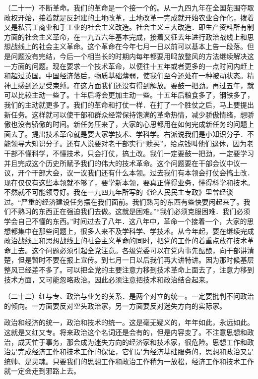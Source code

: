 （二十一）不断革命。我们的革命是一个接一个的。从一九四九年在全国范围夺取政权开始，接着就是反封建的土地改革，土地改革一完成就开始农业合作化，拨着又是私营工商业和手工业的社会主义改造。社会主义三大改造．即生产资料所有制方面的社会主义革命，在一九五六年基本完成，接着又征去年进行政治战线上和思想战线上的社会主义革命。这个革命在今年七月一日以前可以基本上告一段落。但是问题没有完结，今后一个相当长的时期内每年都要用鸣放整风的方法继续解决这一方面的问题。现在要求一个技术革命，以便往十五年或者更多的一点时间内赶上和超过英国。中国经济落后，物质基础薄弱，使我们至今还处在一种被动状态。精神上感到还是受束缚。在这方面我们还没有得到解放。要鼓一把劲。再过五年，就可以比较主动一些了。十年后将会更加主动一些。十五年后粮食多了，钢铁多了，我们的主动就更多了。我们的革命和打仗一样．在打了一个胜仗之后，马上要提出新任务。这样就可以使干部和群众经常保持饱满的革命热情，减少骄傲情绪，想骄傲也没有骄傲的时间。新任务压来了，大家的心思都用在如何完成新任务的问题上面去了。提出技术革命就是要大家学技术、学科学。右派说我们是小知识分子．不能领导大知识分子。还有人说要对老干部实行“赎买”，给点钱叫他们退休，因为老干部不懂科学，不懂技术，只会打仗，搞土改。我们一定要鼓一把劲，一定要学习并且完成这个历史所赋予我们的伟大的技术革命。这个问题要在干部会议中议一议，开个干部大会，议一议我们还有什么本领。过去我们有本领会打仗会搞土改．现在仅仅有这些本领就不够了，要学新本领，要真正懂得业务，懂得科学和技术。不然就不可能领导好。我在一九四九年所写的《论人民民主专政》里曾经谈过。“严重的经济建设任务摆在我们面前。我们熟习的东西有些快要闲起来了。我们不熟习的东西正在强迫我们去做。这就是困难。”“我们必须克服困难．我们必须学会自己不懂的东西。”时间过去了八年．这八年中，革命一个接着一个，大家的思想都集中在那些问题上，很多人来不及学科学、学技术。从今年起，要在继续完成政治战线上和思想战线上的社会主义革命的同时，把党的工作的着重点放在技术革命上去。这个问题必须引起全党注意。各级党委可以在党内事先酝酿，向干部讲清楚，但是暂时不要在报上宣传。到七月一日以后我们再大讲特讲。因为那时候基层整风已经差不多了。可以把全党的主要注意力移到技术革命上面去了，注意力移到技术方面，又可能忽略政治。因此必须注意把技术和政治结合起来。

（二十二）红与专、政治与业务的关系．是两个对立的统一。一定要批判不问政治的倾向。一方面要反对空头政治家，另一方面要反对迷失方向的实际家。

政治和经济的统一，政治和技术的统一。这是毫无疑义的，年年如此，永远如此。这就是又红又专。将来政治这个名词还是会有的，但是内容变了。不注意思想和政治，成天忙于事务，那会成为迷失方向的经济家和技术家，很危险。思想工作和政治是完成经济工作和技术工作的保证，它们是为经济基础服务的，思想和政治又是统帅、是灵魂。只要我们的思想工作和政治工作稍为一放松，经济工作和技术工作就一定会走到邪路上去。

